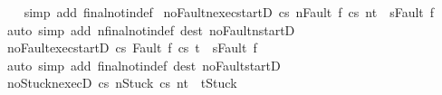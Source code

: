 \begin{isabellebody}
%
\isadelimproof
\ \ %
\endisadelimproof
%
\isatagproof
{}\isamarkupfalse%
\ {\isacharparenleft}simp\ add{\isacharcolon}\ final{\isacharunderscore}notin{\isacharunderscore}def{\isacharparenright}%
\endisatagproof
{\isafoldproof}%
%
\isadelimproof
\isanewline
%
\endisadelimproof
\isanewline
{}\isamarkupfalse%
\ noFaultn{\isacharunderscore}exec{\isacharunderscore}startD{\isacharcolon}\ {\isachardoublequoteopen}{\isasymlbrakk}{\isasymGamma}{\isasymturnstile}{\isasymlangle}c{\isacharcomma}s{\isasymrangle}\ {\isacharequal}n{\isasymRightarrow}{\isasymnotin}{\isacharbraceleft}Fault\ f{\isacharbraceright}{\isacharsemicolon}\ {\isasymGamma}{\isasymturnstile}{\isasymlangle}c{\isacharcomma}s{\isasymrangle}\ {\isacharequal}n{\isasymRightarrow}t{\isasymrbrakk}\ {\isasymLongrightarrow}\ s{\isasymnoteq}Fault\ f{\isachardoublequoteclose}\isanewline
%
\isadelimproof
\ \ %
\endisadelimproof
%
\isatagproof
{}\isamarkupfalse%
\ {\isacharparenleft}auto\ simp\ add{\isacharcolon}\ nfinal{\isacharunderscore}notin{\isacharunderscore}def\ dest{\isacharcolon}\ noFaultn{\isacharunderscore}startD{\isacharparenright}%
\endisatagproof
{\isafoldproof}%
%
\isadelimproof
\isanewline
%
\endisadelimproof
\isanewline
{}\isamarkupfalse%
\ noFault{\isacharunderscore}exec{\isacharunderscore}startD{\isacharcolon}\ {\isachardoublequoteopen}{\isasymlbrakk}{\isasymGamma}{\isasymturnstile}{\isasymlangle}c{\isacharcomma}s{\isasymrangle}\ {\isasymRightarrow}{\isasymnotin}{\isacharbraceleft}Fault\ f{\isacharbraceright}{\isacharsemicolon}\ {\isasymGamma}{\isasymturnstile}{\isasymlangle}c{\isacharcomma}s{\isasymrangle}\ {\isasymRightarrow}t{\isasymrbrakk}\ {\isasymLongrightarrow}\ s{\isasymnoteq}Fault\ f{\isachardoublequoteclose}\isanewline
%
\isadelimproof
\ \ %
\endisadelimproof
%
\isatagproof
{}\isamarkupfalse%
\ {\isacharparenleft}auto\ simp\ add{\isacharcolon}\ final{\isacharunderscore}notin{\isacharunderscore}def\ dest{\isacharcolon}\ noFault{\isacharunderscore}startD{\isacharparenright}%
\endisatagproof
{\isafoldproof}%
%
\isadelimproof
\isanewline
%
\endisadelimproof
\isanewline
{}\isamarkupfalse%
\ noStuckn{\isacharunderscore}execD{\isacharcolon}\ {\isachardoublequoteopen}{\isasymlbrakk}{\isasymGamma}{\isasymturnstile}{\isasymlangle}c{\isacharcomma}s{\isasymrangle}\ {\isacharequal}n{\isasymRightarrow}{\isasymnotin}{\isacharbraceleft}Stuck{\isacharbraceright}{\isacharsemicolon}\ {\isasymGamma}{\isasymturnstile}{\isasymlangle}c{\isacharcomma}s{\isasymrangle}\ {\isacharequal}n{\isasymRightarrow}t{\isasymrbrakk}\ {\isasymLongrightarrow}\ t{\isasymnoteq}Stuck{\isachardoublequoteclose}\isanewline

\end{isabellebody}
